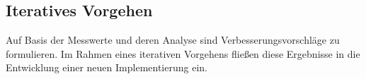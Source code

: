 \subsection{Iteratives Vorgehen}
Auf Basis der Messwerte und deren Analyse sind Verbesserungsvorschläge zu formulieren. Im Rahmen eines iterativen Vorgehens fließen diese Ergebnisse in die Entwicklung einer neuen Implementierung ein.
